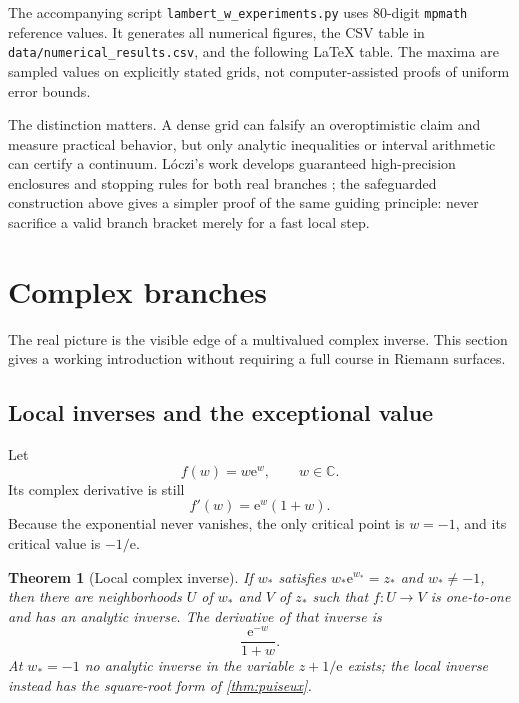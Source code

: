 \documentclass[11pt]{article}
\numberwithin{equation}{section}
\newtheorem{theorem}{Theorem}[section]
\theoremstyle{definition}
\theoremstyle{remark}
\newcommand{\e}{\mathrm e}
\begin{document}
The accompanying script \texttt{lambert\_w\_experiments.py} uses 80-digit
\texttt{mpmath} reference values.  It generates all numerical figures, the
CSV table in \texttt{data/numerical\_results.csv}, and the following LaTeX
table.  The maxima are sampled values on explicitly stated grids, not
computer-assisted proofs of uniform error bounds.



The distinction matters.  A dense grid can falsify an overoptimistic claim and
measure practical behavior, but only analytic inequalities or interval
arithmetic can certify a continuum.  L\'oczi's work develops guaranteed
high-precision enclosures and stopping rules for both real branches
\cite{Loczi2022}; the safeguarded construction above gives a simpler proof of
the same guiding principle: never sacrifice a valid branch bracket merely for
a fast local step.

\section{Complex branches}
\label{sec:complex}

The real picture is the visible edge of a multivalued complex inverse.  This
section gives a working introduction without requiring a full course in
Riemann surfaces.

\subsection{Local inverses and the exceptional value}

Let
\[
  f(w)=w\e^w,
  \qquad w\in\mathbb C.
\]
Its complex derivative is still
\[
  f'(w)=\e^w(1+w).
\]
Because the exponential never vanishes, the only critical point is $w=-1$,
and its critical value is $-1/\e$.

\begin{theorem}[Local complex inverse]
\label{thm:local-complex-inverse}
If $w_*$ satisfies $w_*\e^{w_*}=z_*$ and $w_*\ne-1$, then there are
neighborhoods $U$ of $w_*$ and $V$ of $z_*$ such that $f:U\to V$ is one-to-one
and has an analytic inverse.  The derivative of that inverse is
\[
  \frac{\e^{-w}}{1+w}.
\]
At $w_*=-1$ no analytic inverse in the variable $z+1/\e$ exists; the local
inverse instead has the square-root form of \cref{thm:puiseux}.
\end{theorem}
\end{document}
